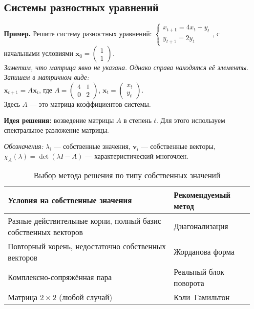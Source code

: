 \subsection{Системы разностных уравнений}\label{subsec:systems}

\textbf{Пример.} Решите систему разностных уравнений:
$\begin{cases} x_{t+1} = 4x_t + y_t \\ y_{t+1} = 2y_t \end{cases}$, с начальными условиями $\mathbf{x}_0 = \begin{pmatrix} 1 \\ 1 \end{pmatrix}$.\\
\textit{Заметим, что матрица явно не указана. Однако справа находятся её элементы. Запишем в матричном виде:} \\
$\mathbf{x}_{t+1} = A\mathbf{x}_t$, где $A = \begin{pmatrix} 4 & 1 \\ 0 & 2 \end{pmatrix}$, \; $\mathbf{x}_t = \begin{pmatrix} x_t \\ y_t \end{pmatrix}$.\\
Здесь $A$ — это матрица коэффициентов системы.


\textbf{Идея решения:} возведение матрицы $A$ в степень $t$. Для этого используем спектральное разложение матрицы.

\textit{Обозначения:} $\lambda_i$ — собственные значения, $\mathbf{v}_i$ — собственные векторы, $\chi_A(\lambda) = \det(\lambda I - A)$ — характеристический многочлен.

\begin{table}[h!]
\centering
\caption{Выбор метода решения по типу собственных значений}
\label{tab:method-selection}
\begin{tabular}{|l|l|}
\hline
\textbf{Условия на собственные значения} & \textbf{Рекомендуемый метод} \\
\hline
Разные действительные корни, полный базис собственных векторов & Диагонализация \\
\hline
Повторный корень, недостаточно собственных векторов & Жорданова форма \\
\hline
Комплексно-сопряжённая пара & Реальный блок поворота \\
\hline
Матрица $2 \times 2$ (любой случай) & Кэли–Гамильтон \\
\hline
\end{tabular}
\end{table}

